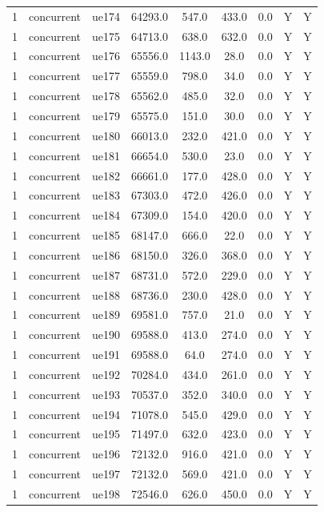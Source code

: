 \begin{table}[ht]
\begin{tabular}{|c|c|c|c|c|c|c|c|c|}
1 & concurrent & ue174 & 64293.0 & 547.0 & 433.0 & 0.0 & Y & Y \\
1 & concurrent & ue175 & 64713.0 & 638.0 & 632.0 & 0.0 & Y & Y \\
1 & concurrent & ue176 & 65556.0 & 1143.0 & 28.0 & 0.0 & Y & Y \\
1 & concurrent & ue177 & 65559.0 & 798.0 & 34.0 & 0.0 & Y & Y \\
1 & concurrent & ue178 & 65562.0 & 485.0 & 32.0 & 0.0 & Y & Y \\
1 & concurrent & ue179 & 65575.0 & 151.0 & 30.0 & 0.0 & Y & Y \\
1 & concurrent & ue180 & 66013.0 & 232.0 & 421.0 & 0.0 & Y & Y \\
1 & concurrent & ue181 & 66654.0 & 530.0 & 23.0 & 0.0 & Y & Y \\
1 & concurrent & ue182 & 66661.0 & 177.0 & 428.0 & 0.0 & Y & Y \\
1 & concurrent & ue183 & 67303.0 & 472.0 & 426.0 & 0.0 & Y & Y \\
1 & concurrent & ue184 & 67309.0 & 154.0 & 420.0 & 0.0 & Y & Y \\
1 & concurrent & ue185 & 68147.0 & 666.0 & 22.0 & 0.0 & Y & Y \\
1 & concurrent & ue186 & 68150.0 & 326.0 & 368.0 & 0.0 & Y & Y \\
1 & concurrent & ue187 & 68731.0 & 572.0 & 229.0 & 0.0 & Y & Y \\
1 & concurrent & ue188 & 68736.0 & 230.0 & 428.0 & 0.0 & Y & Y \\
1 & concurrent & ue189 & 69581.0 & 757.0 & 21.0 & 0.0 & Y & Y \\
1 & concurrent & ue190 & 69588.0 & 413.0 & 274.0 & 0.0 & Y & Y \\
1 & concurrent & ue191 & 69588.0 & 64.0 & 274.0 & 0.0 & Y & Y \\
1 & concurrent & ue192 & 70284.0 & 434.0 & 261.0 & 0.0 & Y & Y \\
1 & concurrent & ue193 & 70537.0 & 352.0 & 340.0 & 0.0 & Y & Y \\
1 & concurrent & ue194 & 71078.0 & 545.0 & 429.0 & 0.0 & Y & Y \\
1 & concurrent & ue195 & 71497.0 & 632.0 & 423.0 & 0.0 & Y & Y \\
1 & concurrent & ue196 & 72132.0 & 916.0 & 421.0 & 0.0 & Y & Y \\
1 & concurrent & ue197 & 72132.0 & 569.0 & 421.0 & 0.0 & Y & Y \\
1 & concurrent & ue198 & 72546.0 & 626.0 & 450.0 & 0.0 & Y & Y \\

\end{tabular}
\end{table}
